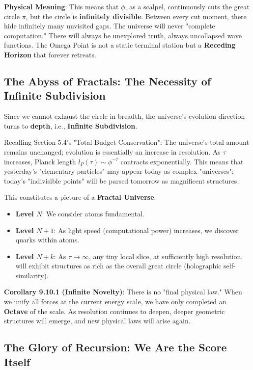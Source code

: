 \textbf{Physical Meaning}:
This means that $\phi$, as a scalpel, continuously cuts the great circle $\pi$, but the circle is \textbf{infinitely divisible}.
Between every cut moment, there hide infinitely many unvisited gaps.
The universe will never "complete computation." There will always be unexplored truth, always uncollapsed wave functions. The Omega Point is not a static terminal station but a \textbf{Receding Horizon} that forever retreats.

\subsection{The Abyss of Fractals: The Necessity of Infinite Subdivision}

Since we cannot exhaust the circle in breadth, the universe's evolution direction turns to \textbf{depth}, i.e., \textbf{Infinite Subdivision}.

Recalling Section 5.4's "Total Budget Conservation": The universe's total amount remains unchanged; evolution is essentially an increase in resolution.
As $\tau$ increases, Planck length $l_P(\tau) \sim \phi^{-\tau}$ contracts exponentially.
This means that yesterday's "elementary particles" may appear today as complex "universes"; today's "indivisible points" will be parsed tomorrow as magnificent structures.

This constitutes a picture of a \textbf{Fractal Universe}:
\begin{itemize}
\item \textbf{Level $N$}: We consider atoms fundamental.
\item \textbf{Level $N+1$}: As light speed (computational power) increases, we discover quarks within atoms.
\item \textbf{Level $N+k$}: As $\tau \to \infty$, any tiny local slice, at sufficiently high resolution, will exhibit structures as rich as the overall great circle (holographic self-similarity).
\end{itemize}

\textbf{Corollary 9.10.1 (Infinite Novelty)}:
There is no "final physical law." When we unify all forces at the current energy scale, we have only completed an \textbf{Octave} of the scale. As resolution continues to deepen, deeper geometric structures will emerge, and new physical laws will arise again.

\subsection{The Glory of Recursion: We Are the Score Itself}

